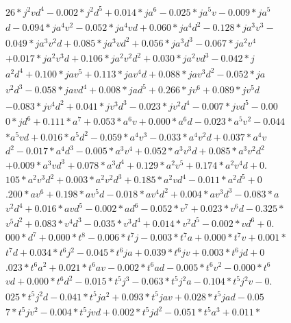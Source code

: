 \begin{align}
  26 * j^2 v d^4 -0.002 * j^2 d^5 + 0.014 * j a^6 -0.025 * j a^5 v -0.009 * j a^5  \\
  d -0.094 * j a^4 v^2 -0.052 * j a^4 v d + 0.060 * j a^4 d^2 -0.128 * j a^3 v^3 - \\
  0.049 * j a^3 v^2 d + 0.085 * j a^3 v d^2 + 0.056 * j a^3 d^3 -0.067 * j a^2 v^4 \\
   + 0.017 * j a^2 v^3 d + 0.106 * j a^2 v^2 d^2 + 0.030 * j a^2 v d^3 -0.042 * j  \\
  a^2 d^4 + 0.100 * j a v^5 + 0.113 * j a v^4 d + 0.088 * j a v^3 d^2 -0.052 * j a \\
   v^2 d^3 -0.058 * j a v d^4 + 0.008 * j a d^5 + 0.266 * j v^6 + 0.089 * j v^5 d  \\
  -0.083 * j v^4 d^2 + 0.041 * j v^3 d^3 -0.023 * j v^2 d^4 -0.007 * j v d^5 -0.00 \\
  0 * j d^6 + 0.111 * a^7 + 0.053 * a^6 v + 0.000 * a^6 d -0.023 * a^5 v^2 -0.044  \\
  * a^5 v d + 0.016 * a^5 d^2 -0.059 * a^4 v^3 -0.033 * a^4 v^2 d + 0.037 * a^4 v  \\
  d^2 -0.017 * a^4 d^3 -0.005 * a^3 v^4 + 0.052 * a^3 v^3 d + 0.085 * a^3 v^2 d^2  \\
  + 0.009 * a^3 v d^3 + 0.078 * a^3 d^4 + 0.129 * a^2 v^5 + 0.174 * a^2 v^4 d + 0. \\
  105 * a^2 v^3 d^2 + 0.003 * a^2 v^2 d^3 + 0.185 * a^2 v d^4 -0.011 * a^2 d^5 + 0 \\
  .200 * a v^6 + 0.198 * a v^5 d -0.018 * a v^4 d^2 + 0.004 * a v^3 d^3 -0.083 * a \\
   v^2 d^4 + 0.016 * a v d^5 -0.002 * a d^6 -0.052 * v^7 + 0.023 * v^6 d -0.325 *  \\
  v^5 d^2 + 0.083 * v^4 d^3 -0.035 * v^3 d^4 + 0.014 * v^2 d^5 -0.002 * v d^6 + 0. \\
  000 * d^7 + 0.000 * t^8 -0.006 * t^7 j -0.003 * t^7 a + 0.000 * t^7 v + 0.001 *  \\
  t^7 d + 0.034 * t^6 j^2 -0.045 * t^6 j a + 0.039 * t^6 j v + 0.003 * t^6 j d + 0 \\
  .023 * t^6 a^2 + 0.021 * t^6 a v -0.002 * t^6 a d -0.005 * t^6 v^2 -0.000 * t^6  \\
  v d + 0.000 * t^6 d^2 -0.015 * t^5 j^3 -0.063 * t^5 j^2 a -0.104 * t^5 j^2 v -0. \\
  025 * t^5 j^2 d -0.041 * t^5 j a^2 + 0.093 * t^5 j a v + 0.028 * t^5 j a d -0.05 \\
  7 * t^5 j v^2 -0.004 * t^5 j v d + 0.002 * t^5 j d^2 -0.051 * t^5 a^3 + 0.011 *  \\

\end{align}
